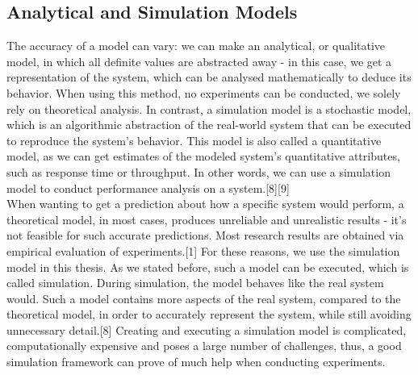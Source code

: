 \subsection{Analytical and Simulation Models}
The accuracy of a model can vary: we can make an analytical, or
qualitative model, in which all definite values are abstracted away -
in this case, we get a representation of
the system, which can be analysed mathematically to deduce its
behavior. When using this method, no experiments can be conducted, we
solely rely on theoretical analysis. In contrast, a simulation model
is a stochastic model, which is an algorithmic abstraction of the
real-world system that can be executed to reproduce the system's
behavior. This model is also called a quantitative model, as we can
get estimates of the modeled system's quantitative attributes, such as
response time or throughput. In other words, we can use a simulation
model to conduct performance analysis on a system.[8][9]\\
When wanting to get a prediction about how a specific system would
perform, a theoretical model, in most cases, produces unreliable and
unrealistic results - it's not feasible for such accurate
predictions. Most research results are obtained via empirical
evaluation of experiments.[1] For these reasons, we use the simulation
model in this thesis. As we stated before, such a model can be
executed, which is called simulation. During simulation, the model
behaves like the real system would. Such a model contains more aspects
of the real system, compared to the theoretical model, in order to
accurately represent the system, while still avoiding unnecessary
detail.[8] Creating and executing a simulation model is complicated,
computationally expensive and poses a large number of challenges,
thus, a good simulation framework can prove of much help when
conducting experiments.

